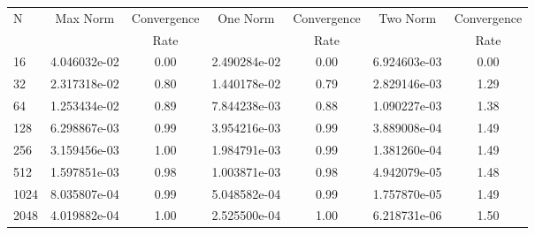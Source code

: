 \documentclass[12pt]{article}
\begin{document}
	\begin{tabular}{l|c|c|c|c|c|c}
		N&Max Norm&Convergence&One Norm&Convergence&Two Norm&Convergence\\
		&&Rate&&Rate&&Rate\\
		\hline
		16&4.046032e-02&0.00&2.490284e-02&0.00&6.924603e-03&0.00\\
		\hline
		32&2.317318e-02&0.80&1.440178e-02&0.79&2.829146e-03&1.29\\
		\hline
		64&1.253434e-02&0.89&7.844238e-03&0.88&1.090227e-03&1.38\\
		\hline
		128&6.298867e-03&0.99&3.954216e-03&0.99&3.889008e-04&1.49\\
		\hline
		256&3.159456e-03&1.00&1.984791e-03&0.99&1.381260e-04&1.49\\
		\hline
		512&1.597851e-03&0.98&1.003871e-03&0.98&4.942079e-05&1.48\\
		\hline
		1024&8.035807e-04&0.99&5.048582e-04&0.99&1.757870e-05&1.49\\
		\hline
		2048&4.019882e-04&1.00&2.525500e-04&1.00&6.218731e-06&1.50\\
	\end{tabular}
\end{document}
